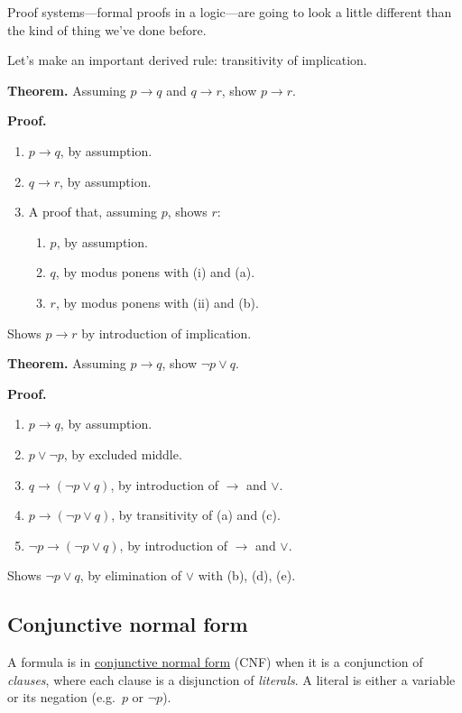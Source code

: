 \documentclass[11pt]{article}
\begin{document}
Proof systems---formal proofs in a logic---are going to look a little different than the kind of thing we've done before.

Let's make an important derived rule: transitivity of implication.

\medskip
\noindent\textbf{Theorem.} Assuming $p \to q$ and $q \to r$, show $p \to r$.

\noindent\textbf{Proof.}
\begin{enumerate}[label=(\alph*)]
  \item $p \to q$, by assumption.
  \item $q \to r$, by assumption.
  \item A proof that, assuming $p$, shows $r$:
    \begin{enumerate}[label=(\roman*)]
      \item $p$, by assumption.
      \item $q$, by modus ponens with (i) and (a).
      \item[(show)] $r$, by modus ponens with (ii) and (b).
    \end{enumerate}
\end{enumerate}
\noindent Shows $p \to r$ by introduction of implication.

\medskip
\noindent\textbf{Theorem.} Assuming $p \to q$, show $\lnot p \vee q$.

\noindent\textbf{Proof.}
\begin{enumerate}[label=(\alph*)]
  \item $p \to q$, by assumption.
  \item $p \vee \lnot p$, by excluded middle.
  \item $q \to (\lnot p \vee q)$, by introduction of $\to$ and $\vee$.
  \item $p \to (\lnot p \vee q)$, by transitivity of (a) and (c).
  \item $\lnot p \to (\lnot p \vee q)$, by introduction of $\to$ and $\vee$.
\end{enumerate}
\noindent Shows $\lnot p \vee q$, by elimination of $\vee$ with (b), (d), (e).

\subsection{Conjunctive normal form}

A formula is in \href{https://en.wikipedia.org/wiki/Conjunctive_normal_form}{conjunctive normal form} (CNF) when it is a conjunction of \emph{clauses}, where each clause is a disjunction of \emph{literals}. A literal is either a variable or its negation (e.g.\ $p$ or $\lnot p$).
\end{document}
